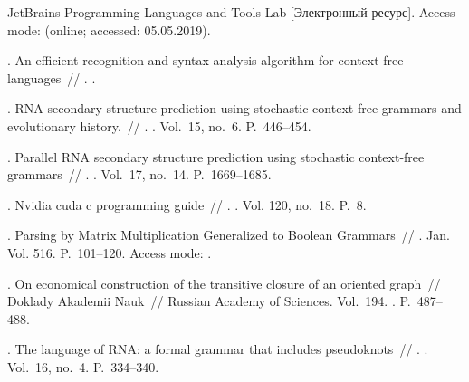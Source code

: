 \begin{thebibliography}{10}
JetBrains Programming Languages and Tools Lab [Электронный
  ресурс]. \BibDash
\newblock Access mode: 
  (online; accessed: 05.05.2019).

. An efficient recognition and syntax-analysis algorithm
  for context-free languages~// . \BibDash
{}.

. RNA secondary structure prediction using
  stochastic context-free grammars and evolutionary history.~//
  . \BibDash
{}. \BibDash
\newblock Vol.~15, no.~6. \BibDash
\newblock P.~446--454.

. Parallel RNA secondary structure prediction
  using stochastic context-free grammars~// . \BibDash
{}. \BibDash
\newblock Vol.~17, no.~14. \BibDash
\newblock P.~1669--1685.

. Nvidia cuda c programming guide~// . \BibDash
{}. \BibDash
\newblock Vol. 120, no.~18. \BibDash
\newblock P.~8.

. Parsing by Matrix Multiplication Generalized to
  Boolean Grammars~//  \BibDash
{}. \BibDash Jan. \BibDash
\newblock Vol. 516. \BibDash
\newblock P.~101--120. \BibDash
\newblock Access mode: .

  .
On economical construction of the transitive closure of an oriented graph~//
   Doklady Akademii Nauk~// Russian Academy of
  Sciences. \BibDash
\newblock Vol.~194. \BibDash
{}. \BibDash
\newblock P.~487--488.

. The language of RNA: a formal grammar that
  includes pseudoknots~// . \BibDash
{}. \BibDash
\newblock Vol.~16, no.~4. \BibDash
\newblock P.~334--340.


\end{thebibliography}
